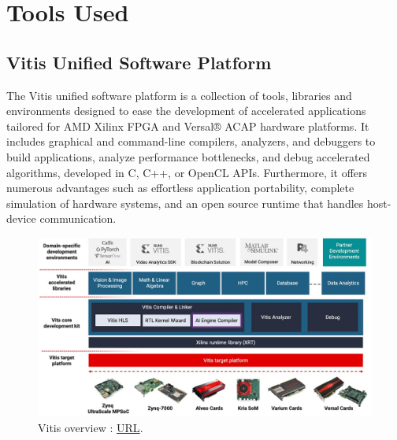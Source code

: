 \section{Tools Used}
\label{sec:fpga_tools_used}
\subsection{Vitis Unified Software Platform}
The Vitis unified software platform\cite{Vitis_unified_software_platform} is a collection of tools, libraries and environments designed to ease the development of accelerated applications tailored for AMD Xilinx FPGA and Versal® ACAP hardware platforms. It includes graphical and command-line compilers, analyzers, and debuggers to build applications, analyze performance bottlenecks, and debug accelerated algorithms, developed in C, C++, or OpenCL APIs. Furthermore, it offers numerous advantages such as effortless application portability, complete simulation of hardware systems, and an open source runtime that handles host-device communication.
\begin{figure}[H]
    \centering
        \includegraphics[width=1\textwidth]{Images/Platform/vitis.jpg}
        \decoRule
        \caption[Vitis]{Vitis overview \cite{Vitis_unified_software_platform}: \href{https://www.xilinx.com/products/design-tools/vitis/vitis-platform.html\#overview}{URL}.}
        \label{fig:Vitis_overview}
\end{figure}

